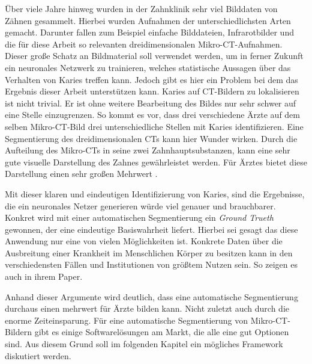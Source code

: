 Über viele Jahre hinweg wurden in der Zahnklinik sehr viel Bilddaten von Zähnen
gesammelt. Hierbei wurden Aufnahmen der unterschiedlichsten Arten gemacht.
Darunter fallen zum Beispiel einfache Bilddateien, Infrarotbilder und die für diese
Arbeit so relevanten dreidimensionalen Mikro-CT-Aufnahmen. Dieser große Schatz
an Bildmaterial soll verwendet werden, um in ferner Zukunft ein neuronales Netzwerk
zu trainieren, welches statistische Aussagen über das Verhalten von Karies
treffen kann. Jedoch gibt es hier ein Problem bei dem das Ergebnis dieser Arbeit
unterstützen kann. Karies auf \ac{CT}-Bildern zu lokalisieren ist nicht trivial.
Er ist ohne weitere Bearbeitung des Bildes nur sehr schwer auf eine Stelle
einzugrenzen. So kommt es vor, dass drei verschiedene Ärzte auf dem selben Mikro-\ac{CT}-Bild
drei unterschiedliche Stellen mit Karies identifizieren. Eine Segmentierung des
dreidimensionalen \ac{CT}s kann hier Wunder wirken. Durch die Aufteilung des Mikro-\ac{CT}s
in seine zwei Zahnhauptsubstanzen, kann eine sehr gute visuelle Darstellung des
Zahnes gewährleistet werden. Für Ärztes bietet diese Darstellung einen sehr großen
Mehrwert \citep[vgl.][S.~1]{walter2025projekt}.

Mit dieser klaren und eindeutigen Identifizierung von Karies, sind die Ergebnisse,
die ein neuronales Netzer generieren würde viel genauer und brauchbarer. Konkret
wird mit einer automatischen Segmentierung ein \textit{Ground Trueth} gewonnen, der
eine eindeutige Basiswahrheit liefert. Hierbei sei gesagt das diese Anwendung
nur eine von vielen Möglichkeiten ist. Konkrete Daten über die Ausbreitung einer
Krankheit im Menschlichen Körper zu besitzen kann in den verschiedensten Fällen und
Institutionen von größtem Nutzen sein. So zeigen es auch \citet[S.~207]{de20083d}
in ihrem Paper.

Anhand dieser Argumente wird deutlich, dass eine automatische Segmentierung
durchaus einen mehrwert für Ärzte bilden kann. Nicht zuletzt auch durch die enorme
Zeiteinsparung. Für eine automatische Segmentierung von Mikro-\ac{CT}-Bildern gibt
es einige Softwarelösungen am Markt, die alle eine gut Optionen sind. Aus diesem
Grund soll im folgenden Kapitel ein mögliches Framework diskutiert werden.

